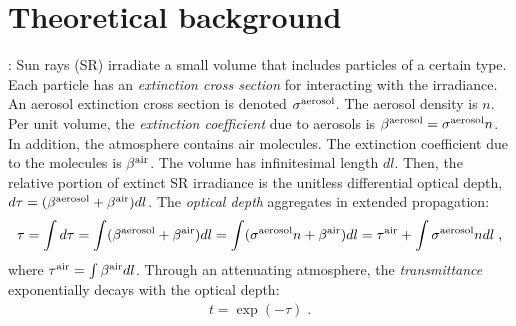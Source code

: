\documentclass[10pt,letterpaper]{article}
\begin{document}

\section{Theoretical background}
\label{sec:theor-backgr}

: Sun rays (SR) irradiate a small volume
that includes particles of a certain type.  Each particle has an {\em
  extinction cross section} for interacting with the irradiance. An
aerosol extinction cross section is denoted $\sigma^{\rm aerosol}$.
The aerosol density is $n$. Per unit volume, the {\em extinction
  coefficient} due to aerosols is $\beta^{\rm aerosol}= \sigma^{\rm
  aerosol} n$. In addition, the atmosphere contains air molecules.
The extinction coefficient due to the molecules is $\beta^{\rm air}$.
The volume has infinitesimal length $dl$. Then, the relative portion
of extinct SR irradiance is the unitless differential optical depth,
$d\tau= (\beta^{\rm aerosol}+\beta^{\rm air}) dl$.  The {\em optical
  depth} aggregates in extended propagation:
\begin{align}
  \tau= \int d\tau=\int (\beta^{\rm aerosol}+\beta^{\rm air}) dl =\int
  (\sigma^{\rm aerosol} n +\beta^{\rm air}) dl = \tau^{\rm air}+ \int
  \sigma^{\rm aerosol} n dl \;,
  \label{eq:tau}
\end{align}
where $\tau^{\rm air}=\int \beta^{\rm air} dl$.  Through an
attenuating atmosphere, the {\em transmittance} exponentially decays
with the optical depth:
\begin{align}
  t=\exp(-\tau) \;.
  \label{eq:beer-lambert}
\end{align}
\end{document}
